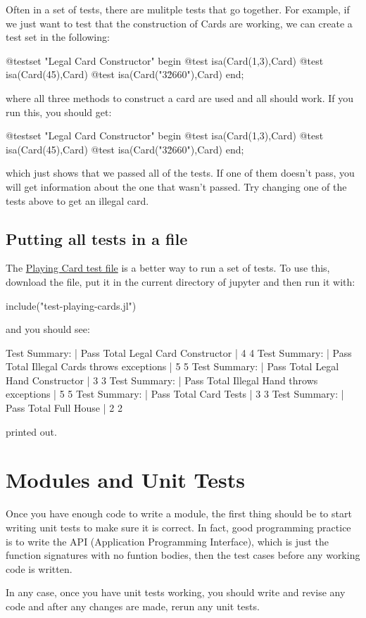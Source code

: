 Often in a set of tests, there are mulitple tests that go together. For
example, if we just want to test that the construction of Cards are
working, we can create a test set in the following:

\begin{jlblock}[modules]
@testset "Legal Card Constructor" begin
  @test isa(Card(1,3),Card)
  @test isa(Card(45),Card)
  @test isa(Card("3\u2660"),Card)
end;
\end{jlblock}
%
where all three methods to construct a card are used and all should
work. If you run this, you should get:
%
\begin{jlcode}[modules]
@testset "Legal Card Constructor" begin
  @test isa(Card(1,3),Card)
  @test isa(Card(45),Card)
  @test isa(Card("3\u2660"),Card)
end;
\end{jlcode}

\printpythontex[verbatim]
%
which just shows that we passed all of the tests. If one of them doesn't
pass, you will get information about the one that wasn't passed. Try
changing one of the tests above to get an illegal card.

\hypertarget{putting-all-tests-in-a-file}{%
\subsection{Putting all tests in a
file}\label{putting-all-tests-in-a-file}}

The \href{test-playing-cards.jl}{Playing Card test file} is a better way
to run a set of tests. To use this, download the file, put it in the
current directory of jupyter and then run it with:

\begin{jlverbatim}
include("test-playing-cards.jl")
\end{jlverbatim}

and you should see:

\begin{jlverbatim}
Test Summary:          | Pass  Total
Legal Card Constructor |    4      4
Test Summary:                   | Pass  Total
Illegal Cards throws exceptions |    5      5
Test Summary:          | Pass  Total
Legal Hand Constructor |    3      3
Test Summary:                  | Pass  Total
Illegal Hand throws exceptions |    5      5
Test Summary: | Pass  Total
Card Tests    |    3      3
Test Summary: | Pass  Total
Full House    |    2      2
\end{jlverbatim}
%
printed out.

\hypertarget{modules-and-unit-tests}{%
\section{Modules and Unit Tests}\label{modules-and-unit-tests}}

Once you have enough code to write a module, the first thing should be to start writing unit tests to make sure it is correct. In fact, good programming practice is to write the API (Application Programming Interface), which is just the function signatures with no funtion bodies, then the test cases before any working code is written.

In any case, once you have unit tests working, you should write and revise any code and after any changes are made, rerun any unit tests.
